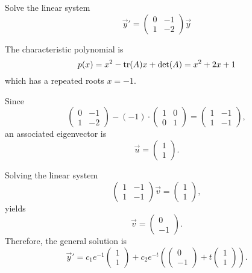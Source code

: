\begin{example}
  Solve the linear system
  \[
    \vec{y}'=\begin{pmatrix}
      0 & -1\\
      1 & -2
    \end{pmatrix}\vec{y}  
  \]
\end{example}

\begin{solution}
  The characteristic polynomial is
  \[
  p(x)=x^2-\operatorname{tr}(A)x+\det(A)=x^2+2x+1  
  \]
  which has a repeated roots $x=-1$.
  
  Since
  \[
    \begin{pmatrix}
      0 & -1\\
      1 & -2
    \end{pmatrix}- (-1)\cdot 
  \begin{pmatrix}
    1 & 0\\
    0 & 1
  \end{pmatrix}  
  =
  \begin{pmatrix}
    1 & -1\\
    1 & -1
  \end{pmatrix},
  \]
  an associated eigenvector is
  \[
  \vec{u}=
  \begin{pmatrix}
    1 \\ 1
  \end{pmatrix}.  
  \]

  Solving the linear system
  \[
    \begin{pmatrix}
      1 & -1\\
      1 & -1
    \end{pmatrix} 
  \vec{v}  
  =
  \begin{pmatrix}
    1\\
    1
  \end{pmatrix},
  \]
  yields
  \[
  \vec{v}=
  \begin{pmatrix}
    0 \\ -1
  \end{pmatrix}.  
  \]
Therefore, the general solution is
\[
\vec{y}'=c_1e^{-1}\begin{pmatrix}
  1 \\ 1
\end{pmatrix}  + c_2e^{-t}\left(
  \begin{pmatrix}
    0 \\ -1
  \end{pmatrix}
+
t\begin{pmatrix}
  1 \\ 1
\end{pmatrix}\right).
\] 
\end{solution}

